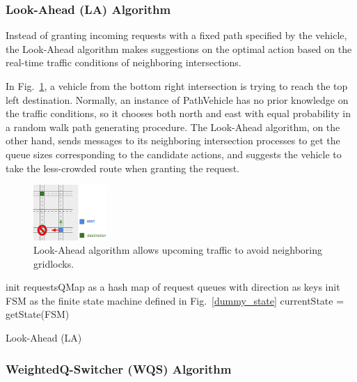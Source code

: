 \documentclass[conference]{IEEEtran}
\begin{document}
\subsubsection{ Look-Ahead (LA) Algorithm}

Instead of granting incoming requests with a fixed path specified by the vehicle, the Look-Ahead algorithm makes suggestions on the optimal action based on the real-time traffic conditions of neighboring intersections. 

In Fig.~\ref{la_example}, a vehicle from the bottom right intersection is trying to reach the top left destination. Normally, an instance of PathVehicle has no prior knowledge on the traffic conditions, so it chooses both north and east with equal probability in a random walk path generating procedure. The Look-Ahead algorithm, on the other hand, sends messages to its neighboring intersection processes to get the queue sizes corresponding to the candidate actions, and suggests the vehicle to take the less-crowded route when granting the request.



\begin{figure}[h]
    \center    
    \includegraphics[width=0.25\textwidth]{images/la_example.png}
	\caption{Look-Ahead algorithm allows upcoming traffic to avoid neighboring gridlocks.}
	\label{la_example}
\end{figure}

\begin{algorithm}
  init requestsQMap as a hash map of request queues with direction as keys\;
  init FSM as the finite state machine defined in Fig.~\ref{dummy_state}\;
   {
  	currentState = getState(FSM)\;
  }
  \caption{Look-Ahead (LA) \label{look_ahead}}
\end{algorithm}


\subsubsection{ WeightedQ-Switcher (WQS) Algorithm}
\end{document}
